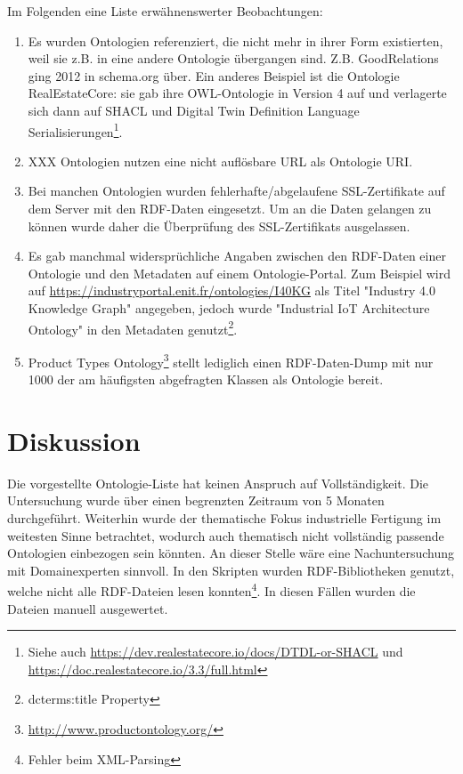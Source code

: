 \documentclass{article}
\begin{document}
Im Folgenden eine Liste erwähnenswerter Beobachtungen:

\begin{enumerate}
    \item Es wurden Ontologien referenziert, die nicht mehr in ihrer Form existierten, weil sie z.B. in eine andere Ontologie übergangen sind. Z.B. GoodRelations ging 2012 in schema.org über. Ein anderes Beispiel ist die Ontologie RealEstateCore: sie gab ihre OWL-Ontologie in Version 4 auf und verlagerte sich dann auf SHACL und Digital Twin Definition Language Serialisierungen\footnote{Siehe auch \url{https://dev.realestatecore.io/docs/DTDL-or-SHACL} und \url{https://doc.realestatecore.io/3.3/full.html}}.
    \item XXX Ontologien nutzen eine nicht auflösbare URL als Ontologie URI.
    \item Bei manchen Ontologien wurden fehlerhafte/abgelaufene SSL-Zertifikate auf dem Server mit den RDF-Daten eingesetzt. Um an die Daten gelangen zu können wurde daher die Überprüfung des SSL-Zertifikats ausgelassen.
    \item Es gab manchmal widersprüchliche Angaben zwischen den RDF-Daten einer Ontologie und den Metadaten auf einem Ontologie-Portal. Zum Beispiel wird auf \url{https://industryportal.enit.fr/ontologies/I40KG} als Titel "Industry 4.0 Knowledge Graph" angegeben, jedoch wurde "Industrial IoT Architecture Ontology" in den Metadaten genutzt\footnote{dcterms:title Property}.
    \item Product Types Ontology\footnote{\url{http://www.productontology.org/}} stellt lediglich einen RDF-Daten-Dump mit nur 1000 der am häufigsten abgefragten Klassen als Ontologie bereit.
\end{enumerate}

\section{Diskussion}

Die vorgestellte Ontologie-Liste hat keinen Anspruch auf Vollständigkeit.
Die Untersuchung wurde über einen begrenzten Zeitraum von 5 Monaten durchgeführt.
Weiterhin wurde der thematische Fokus industrielle Fertigung im weitesten Sinne betrachtet, wodurch auch thematisch nicht vollständig passende Ontologien einbezogen sein könnten.
An dieser Stelle wäre eine Nachuntersuchung mit Domainexperten sinnvoll.
In den Skripten wurden RDF-Bibliotheken genutzt, welche nicht alle RDF-Dateien lesen konnten\footnote{Fehler beim XML-Parsing}.
In diesen Fällen wurden die Dateien manuell ausgewertet.
\end{document}
